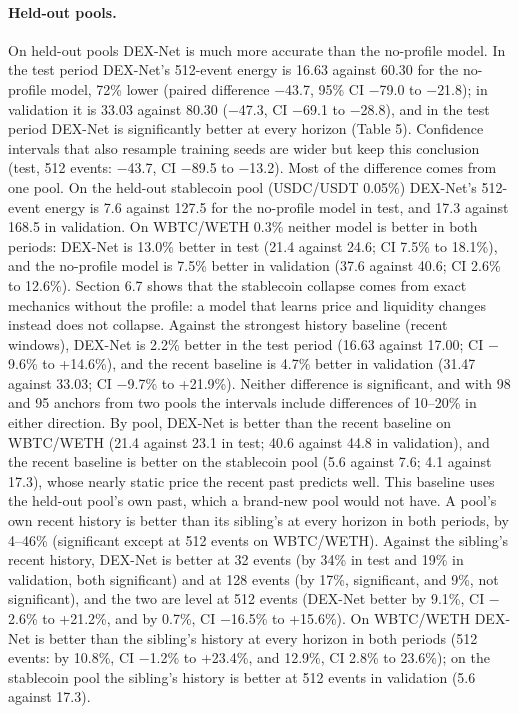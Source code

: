 \documentclass[11pt]{article}
\begin{document}
\paragraph{Held-out pools.} On held-out pools DEX-Net is much more accurate than the no-profile model. In the test period DEX-Net's 512-event energy is 16.63 against 60.30 for the no-profile model, 72\% lower (paired difference \ensuremath{-}43.7, 95\% CI \ensuremath{-}79.0 to \ensuremath{-}21.8); in validation it is 33.03 against 80.30 (\ensuremath{-}47.3, CI \ensuremath{-}69.1 to \ensuremath{-}28.8), and in the test period DEX-Net is significantly better at every horizon (Table 5). Confidence intervals that also resample training seeds are wider but keep this conclusion (test, 512 events: \ensuremath{-}43.7, CI \ensuremath{-}89.5 to \ensuremath{-}13.2). Most of the difference comes from one pool. On the held-out stablecoin pool (USDC/USDT 0.05\%) DEX-Net's 512-event energy is 7.6 against 127.5 for the no-profile model in test, and 17.3 against 168.5 in validation. On WBTC/WETH 0.3\% neither model is better in both periods: DEX-Net is 13.0\% better in test (21.4 against 24.6; CI 7.5\% to 18.1\%), and the no-profile model is 7.5\% better in validation (37.6 against 40.6; CI 2.6\% to 12.6\%). Section 6.7 shows that the stablecoin collapse comes from exact mechanics without the profile: a model that learns price and liquidity changes instead does not collapse. Against the strongest history baseline (recent windows), DEX-Net is 2.2\% better in the test period (16.63 against 17.00; CI \ensuremath{-}9.6\% to +14.6\%), and the recent baseline is 4.7\% better in validation (31.47 against 33.03; CI \ensuremath{-}9.7\% to +21.9\%). Neither difference is significant, and with 98 and 95 anchors from two pools the intervals include differences of 10--20\% in either direction. By pool, DEX-Net is better than the recent baseline on WBTC/WETH (21.4 against 23.1 in test; 40.6 against 44.8 in validation), and the recent baseline is better on the stablecoin pool (5.6 against 7.6; 4.1 against 17.3), whose nearly static price the recent past predicts well. This baseline uses the held-out pool's own past, which a brand-new pool would not have. A pool's own recent history is better than its sibling's at every horizon in both periods, by 4--46\% (significant except at 512 events on WBTC/WETH). Against the sibling's recent history, DEX-Net is better at 32 events (by 34\% in test and 19\% in validation, both significant) and at 128 events (by 17\%, significant, and 9\%, not significant), and the two are level at 512 events (DEX-Net better by 9.1\%, CI \ensuremath{-}2.6\% to +21.2\%, and by 0.7\%, CI \ensuremath{-}16.5\% to +15.6\%). On WBTC/WETH DEX-Net is better than the sibling's history at every horizon in both periods (512 events: by 10.8\%, CI \ensuremath{-}1.2\% to +23.4\%, and 12.9\%, CI 2.8\% to 23.6\%); on the stablecoin pool the sibling's history is better at 512 events in validation (5.6 against 17.3).
\end{document}
